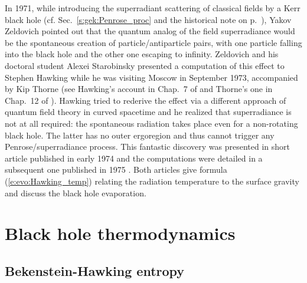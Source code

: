 \begin{hist} \label{h:evo:Hawking_rad}
In 1971, while introducing the superradiant scattering
of classical fields by a Kerr black hole
(cf. Sec.~\ref{s:gek:Penrose_proc} and
the historical note on p.~\pageref{h:gek:Penrose_superradiance}),
Yakov Zeldovich \cite{Zeldo71} pointed out that the quantum analog of the field superradiance
would be the spontaneous creation of particle/antiparticle pairs,  with one particle falling into the black hole
and the other one escaping to infinity. Zeldovich and his doctoral student Alexei Starobinsky presented a computation of this effect to Stephen Hawking while he was visiting Moscow
in September 1973, accompanied by Kip Thorne (see Hawking's account in Chap.~7 of \cite{Hawki88} and Thorne's one in Chap.~12 of \cite{Thorn94}).
Hawking tried to rederive the effect via a different approach
of quantum field theory in curved spacetime and he realized that superradiance
is not at all required: the spontaneous radiation takes place even for
a non-rotating black hole. The latter has no outer ergoregion and thus cannot trigger
any Penrose/superradiance process. This fantastic discovery was presented
in short article published in early 1974 \cite{Hawki74} and the computations were detailed in a subsequent one published in 1975 \cite{Hawki75}. Both articles give formula (\ref{e:evo:Hawking_temp})
relating the radiation temperature to the surface gravity and discuss the black hole evaporation.
\end{hist}


\section{Black hole thermodynamics} \label{s:evo:BH_thermo}

\subsection{Bekenstein-Hawking entropy} \label{s:evo:BH_entropy}

